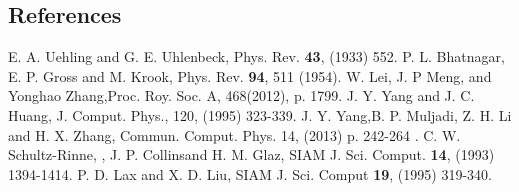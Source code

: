 \documentclass[twoside,twocolumn,prc,floats,amsmath,amssymb]{revtex4} %
\begin{document}
\vspace*{-.25cm}
\begin{thebibliography}{1}
\section{References}
 E. A. Uehling and G. E. Uhlenbeck, Phys. Rev. {\bf 43}, (1933) 552. 
 P. L. Bhatnagar, E. P. Gross and M. Krook, Phys. Rev. {\bf 94}, 511 (1954).
 W. Lei, J. P Meng, and Yonghao Zhang,Proc. Roy. Soc. A, 468(2012), p. 1799.
 J. Y. Yang and J. C. Huang, J. Comput. Phys., 120, (1995) 323-339.
 J. Y. Yang,B. P. Muljadi, Z. H. Li and H. X. Zhang, Commun. Comput. Phys. 14, (2013) p. 242-264 .
 C. W. Schultz-Rinne, , J. P. Collinsand H. M. Glaz, SIAM J. Sci. Comput. {\bf 14}, (1993) 1394-1414.
 P. D. Lax and X. D. Liu, SIAM J. Sci. Comput {\bf 19}, (1995) 319-340.

\end{thebibliography}
%
\end{document}
